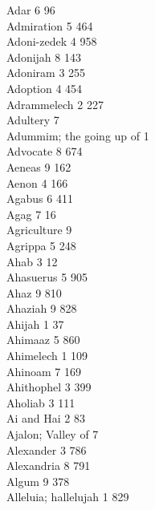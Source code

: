 Adar \hfill 6 \quad \phantom{0}\phantom{0}96\\
Admiration \hfill 5 \quad \phantom{0}464\\
Adoni-zedek \hfill 4 \quad \phantom{0}958\\
Adonijah \hfill 8 \quad \phantom{0}143\\
Adoniram \hfill 3 \quad \phantom{0}255\\
Adoption \hfill 4 \quad \phantom{0}454\\
Adrammelech \hfill 2 \quad \phantom{0}227\\
Adultery \hfill 7 \\
Adummim; the going up of \hfill 1 \\
Advocate \hfill 8 \quad \phantom{0}674\\
Aeneas \hfill 9 \quad \phantom{0}162\\
Aenon \hfill 4 \quad \phantom{0}166\\
Agabus \hfill 6 \quad \phantom{0}411\\
Agag \hfill 7 \quad \phantom{0}\phantom{0}16\\
Agriculture \hfill 9 \\
Agrippa \hfill 5 \quad \phantom{0}248\\
Ahab \hfill 3 \quad \phantom{0}\phantom{0}12\\
Ahasuerus \hfill 5 \quad \phantom{0}905\\
Ahaz \hfill 9 \quad \phantom{0}810\\
Ahaziah \hfill 9 \quad \phantom{0}828\\
Ahijah \hfill 1 \quad \phantom{0}\phantom{0}37\\
Ahimaaz \hfill 5 \quad \phantom{0}860\\
Ahimelech \hfill 1 \quad \phantom{0}109\\
Ahinoam \hfill 7 \quad \phantom{0}169\\
Ahithophel \hfill 3 \quad \phantom{0}399\\
Aholiab \hfill 3 \quad \phantom{0}111\\
Ai and Hai \hfill 2 \quad \phantom{0}\phantom{0}83\\
Ajalon; Valley of \hfill 7 \\
Alexander \hfill 3 \quad \phantom{0}786\\
Alexandria \hfill 8 \quad \phantom{0}791\\
Algum \hfill 9 \quad \phantom{0}378\\
Alleluia; hallelujah \hfill 1 \quad \phantom{0}829\\
